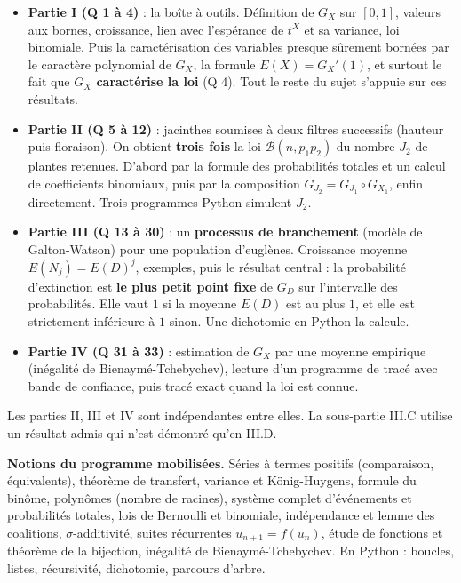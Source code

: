 \documentclass[11pt,a4paper]{article}
\providecommand{\tightlist}{\setlength{\itemsep}{0pt}\setlength{\parskip}{0pt}}
\begin{document}
\begin{itemize}
\tightlist
\item
  \textbf{Partie I (Q 1 à 4)} : la boîte à outils. Définition de \(G_X\) sur \([0,1]\), valeurs aux bornes, croissance, lien avec l'espérance de \(t^X\) et sa variance, loi binomiale. Puis la caractérisation des variables presque sûrement bornées par le caractère polynomial de \(G_X\), la formule \(E(X)=G_X'(1)\), et surtout le fait que \textbf{\(G_X\) caractérise la loi} (Q 4). Tout le reste du sujet s'appuie sur ces résultats.
\item
  \textbf{Partie II (Q 5 à 12)} : jacinthes soumises à deux filtres successifs (hauteur puis floraison). On obtient \textbf{trois fois} la loi \(\mathcal B(n,p_1p_2)\) du nombre \(J_2\) de plantes retenues. D'abord par la formule des probabilités totales et un calcul de coefficients binomiaux, puis par la composition \(G_{J_2}=G_{J_1}\circ G_{X_1}\), enfin directement. Trois programmes Python simulent \(J_2\).
\item
  \textbf{Partie III (Q 13 à 30)} : un \textbf{processus de branchement} (modèle de Galton-Watson) pour une population d'euglènes. Croissance moyenne \(E(N_j)=E(D)^j\), exemples, puis le résultat central : la probabilité d'extinction est \textbf{le plus petit point fixe} de \(G_D\) sur l'intervalle des probabilités. Elle vaut \(1\) si la moyenne \(E(D)\) est au plus \(1\), et elle est strictement inférieure à \(1\) sinon. Une dichotomie en Python la calcule.
\item
  \textbf{Partie IV (Q 31 à 33)} : estimation de \(G_X\) par une moyenne empirique (inégalité de Bienaymé-Tchebychev), lecture d'un programme de tracé avec bande de confiance, puis tracé exact quand la loi est connue.
\end{itemize}

Les parties II, III et IV sont indépendantes entre elles. La sous-partie III.C utilise un résultat admis qui n'est démontré qu'en III.D.

\textbf{Notions du programme mobilisées.} Séries à termes positifs (comparaison, équivalents), théorème de transfert, variance et König-Huygens, formule du binôme, polynômes (nombre de racines), système complet d'événements et probabilités totales, lois de Bernoulli et binomiale, indépendance et lemme des coalitions, \(\sigma\)-additivité, suites récurrentes \(u_{n+1}=f(u_n)\), étude de fonctions et théorème de la bijection, inégalité de Bienaymé-Tchebychev. En Python : boucles, listes, récursivité, dichotomie, parcours d'arbre.
\end{document}
